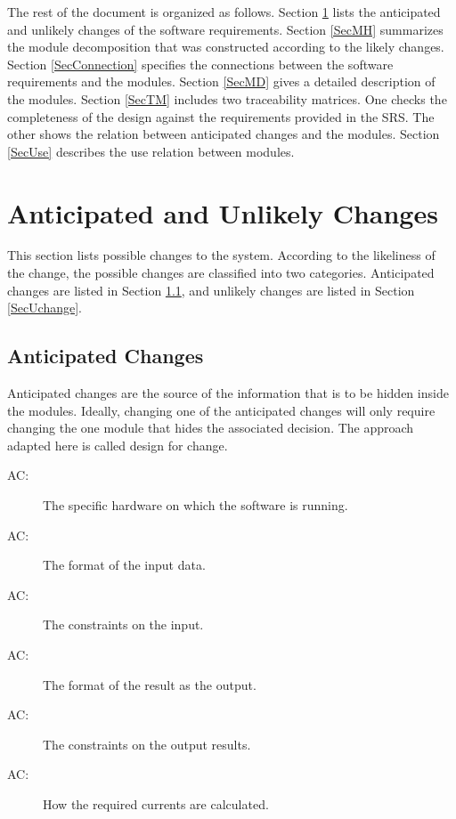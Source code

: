\documentclass[12pt, titlepage]{article}
\newcounter{acnum}
\newcommand{\actheacnum}{AC\theacnum}
\begin{document}
The rest of the document is organized as follows. Section
\ref{SecChange} lists the anticipated and unlikely changes of the software
requirements. Section \ref{SecMH} summarizes the module decomposition that
was constructed according to the likely changes. Section \ref{SecConnection}
specifies the connections between the software requirements and the
modules. Section \ref{SecMD} gives a detailed description of the
modules. Section \ref{SecTM} includes two traceability matrices. One checks
the completeness of the design against the requirements provided in the SRS. The
other shows the relation between anticipated changes and the modules. Section
\ref{SecUse} describes the use relation between modules.

\section{Anticipated and Unlikely Changes} \label{SecChange}

This section lists possible changes to the system. According to the likeliness
of the change, the possible changes are classified into two
categories. Anticipated changes are listed in Section \ref{SecAchange}, and
unlikely changes are listed in Section \ref{SecUchange}.

\subsection{Anticipated Changes} \label{SecAchange}

Anticipated changes are the source of the information that is to be hidden
inside the modules. Ideally, changing one of the anticipated changes will only
require changing the one module that hides the associated decision. The approach
adapted here is called design for
change.

\begin{description}
\item[ \actheacnum \label{acHardware}:] The specific hardware on which the software is running.
\item[ \actheacnum \label{acInputData}:] The format of the input data.
\item[ \actheacnum \label{acInputConstraints}:] The constraints on the input.
\item[ \actheacnum \label{acOutputFormat}:] The format of the result as the output.
\item[ \actheacnum \label{acOutputConstraints}:] The constraints on the output results.
\item[ \actheacnum \label{acCurrentCalculation}:] How the required currents are calculated.
\end{description}
\end{document}

